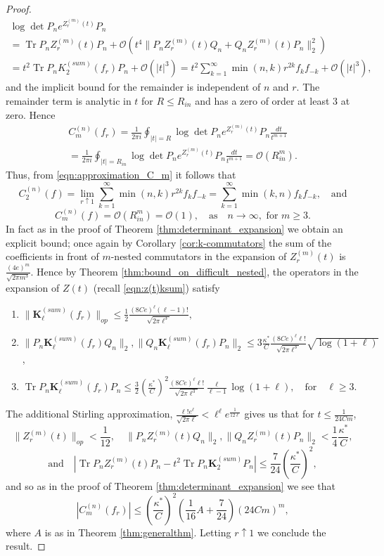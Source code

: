 \documentclass[11pt]{amsart}
\theoremstyle{plain}
\theoremstyle{remark}
\DeclareMathOperator{\Tr}{Tr}
\numberwithin{equation}{section}
\begin{document}
\begin{proof}
\begin{multline}
\log \det P_n e^{Z_r^{(m)}(t)}P_n
\\=  \Tr P_n Z_r^{(m)}(t)P_n+ \mathcal{O}\left( t^4\|P_n Z_r^{(m)}(t) Q_n+Q_nZ_r^{(m)}(t) P_n\|_2^2\right)
\\=t^2 \Tr P_n K_2^{(sum)}(f_r)P_n +\mathcal{O}(|t|^3)=t^2 \sum_{k=1}^{\infty}\min(n, k) r^{2k} f_k f_{-k}+\mathcal{O}(|t|^3),
\end{multline}
and the implicit bound for the remainder is independent of $n$ and $r$. The remainder term is analytic in $t$ for $R\leq R_{in}$ and has a zero of order at least $3$ at zero. Hence 
\begin{multline}
C_{m}^{(n)}(f_r)
=\frac{1}{2\pi i}\oint_{|t|=R}\log \det P_n e^{Z_r^{(m)}(t)}P_n\frac{dt}{t^{m+1}}
\\
=\frac{1}{2\pi i}\oint_{|t|=R_{in}}\log \det P_n e^{Z_r^{(m)}(t)}P_n\frac{dt}{t^{m+1}}
%
=\mathcal{O}(R_{in}^{m}).
\end{multline}
Thus, from \eqref{eqn:approximation_C_m} it follows that 
$$C_2^{(n)}(f)=\lim_{r\uparrow 1} \sum_{k=1}^{\infty} \min(n, k) r^{2k} f_k f_{-k}=\sum_{k=1}^{\infty} \min(k,n) f_k f_{-k},\quad \text{and}$$
$$C_m^{(n)}(f)=\mathcal{O}(R_{in}^m)=\mathcal{O}(1),\quad\text{as}\quad n\rightarrow\infty, \text{ for } m\geq 3.$$
In fact as in the proof of Theorem \ref{thm:determinant_expansion} we obtain an explicit bound; once again by Corollary \ref{cor:k-commutators} the sum of the coefficients in front of $m$-nested commutators in the expansion of $Z_r^{(m)}(t)$ is $\frac{(4e)^m} 
{\sqrt{2\pi m^3}}$. 
Hence by Theorem \ref{thm:bound_on_difficult_nested}, the operators in the expansion of $Z(t)$ (recall \eqref{eqn:z(t)ksum}) satisfy
\begin{enumerate}
\item 
$
\|\mathbf{K}_{\ell}^{(sum)}(f_r)\|_{op}\leq 
%
\frac{1}{2}\frac{(8Ce)^{\ell}(\ell-1)!}{\sqrt{2\pi \ell^3}},
$
\item $\|P_n\mathbf{K}_{\ell}^{(sum)}(f_r)Q_n\|_{2}, \|Q_n\mathbf{K}_{\ell}^{(sum)}(f_r)P_n\|_{2}
\leq  
3\frac{\kappa^*}{C} \frac{(8Ce)^{\ell}\ell!}{\sqrt{2\pi \ell^3}} \sqrt{\log(1+\ell)}
$,
\item 
$
\Tr  P_n \mathbf{K}_{\ell}^{(sum)}(f_r) P_n 
\leq 
\frac{3}{2}
\left(\frac{\kappa^*}{C}\right)^{2} 
\frac{(8Ce)^{\ell} \ell!}{\sqrt{2\pi \ell^3}}
\frac{\ell}{\ell-1}\log(1+\ell),
\quad\text{for}\quad \ell\geq 3.
$
\end{enumerate}
The additional Stirling approximation, $\frac{\ell!e^{\ell}}{\sqrt{2\pi \ell}}< \ell^\ell e ^{\frac{1}{12\ell}}$ gives us that for $t\leq \frac{1}{24C m}$,
$$\|Z_r^{(m)}(t)\|_{op}< \frac{1}{12},\quad \|P_nZ_r^{(m)}(t)Q_n\|_2, \|Q_nZ_r^{(m)}(t)P_n\|_2< \frac{1}{4}\frac{\kappa^*}{C},$$
$$\text{and}\quad\left|\Tr  P_nZ_r^{(m)}(t)P_n
- t^2\Tr  P_n\mathbf{K}_2^{(sum)}P_n\right|
\leq
\frac{7}{24}\left(\frac{\kappa^*}{C}\right)^2,
$$
and so as in the proof of Theorem \ref{thm:determinant_expansion}
we see that 
$$|C_m^{(n)}(f_r)|\leq \left(\frac{\kappa^*}{C}\right)^2 \left(\frac{1}{16}A +\frac{7}{24}
\right)\left(24Cm\right)^{m},$$
where $A$ is as in Theorem \ref{thm:generalthm}. Letting $r\uparrow 1$ we conclude the result.
\end{proof}
\end{document}
